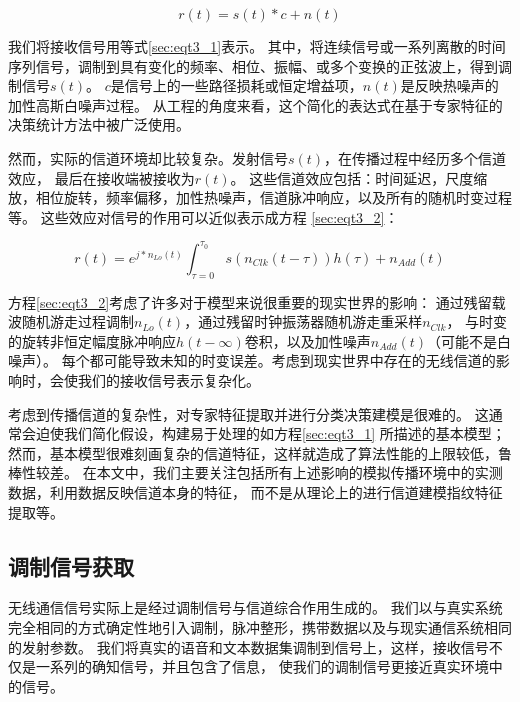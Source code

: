 \begin{equation}\label{sec:eqt3_1}
r(t) = s(t)*c + n(t)
\end{equation}

我们将接收信号用等式\ref{sec:eqt3_1}表示。
其中，将连续信号或一系列离散的时间序列信号，调制到具有变化的频率、相位、振幅、或多个变换的正弦波上，得到调制信号$s(t)$。
 $c$是信号上的一些路径损耗或恒定增益项，$n(t)$是反映热噪声的加性高斯白噪声过程。
 从工程的角度来看，这个简化的表达式在基于专家特征的决策统计方法中被广泛使用。\par

然而，实际的信道环境却比较复杂。发射信号$s(t)$，在传播过程中经历多个信道效应， 最后在接收端被接收为$r(t)$。
这些信道效应包括：时间延迟，尺度缩放，相位旋转，频率偏移，加性热噪声，信道脉冲响应，以及所有的随机时变过程等。 
这些效应对信号的作用可以近似表示成方程 \ref{sec:eqt3_2}：\par

\begin{equation}\label{sec:eqt3_2}
	r(t) = e^{j*n_{Lo}(t)} \int_{\tau=0}^{\tau_{0}} s(n_{Clk}(t-\tau))h(\tau) + n_{Add}(t)
\end{equation}

方程\ref{sec:eqt3_2}考虑了许多对于模型来说很重要的现实世界的影响：
通过残留载波随机游走过程调制$n_{Lo}(t)$，通过残留时钟振荡器随机游走重采样$n_{Clk}$，
与时变的旋转非恒定幅度脉冲响应$h(t-∞)$卷积，以及加性噪声$n_{Add}(t)$（可能不是白噪声）。
每个都可能导致未知的时变误差。考虑到现实世界中存在的无线信道的影响时，会使我们的接收信号表示复杂化。\par

考虑到传播信道的复杂性，对专家特征提取并进行分类决策建模是很难的。
这通常会迫使我们简化假设，构建易于处理的如方程\ref{sec:eqt3_1} 所描述的基本模型；
然而，基本模型很难刻画复杂的信道特征，这样就造成了算法性能的上限较低，鲁棒性较差。
在本文中，我们主要关注包括所有上述影响的模拟传播环境中的实测数据，利用数据反映信道本身的特征，
而不是从理论上的进行信道建模指纹特征提取等。\par

\subsection{调制信号获取}

无线通信信号实际上是经过调制信号与信道综合作用生成的。
我们以与真实系统完全相同的方式确定性地引入调制，脉冲整形，携带数据以及与现实通信系统相同的发射参数。 
我们将真实的语音和文本数据集调制到信号上，这样，接收信号不仅是一系列的确知信号，并且包含了信息，
使我们的调制信号更接近真实环境中的信号。\par

